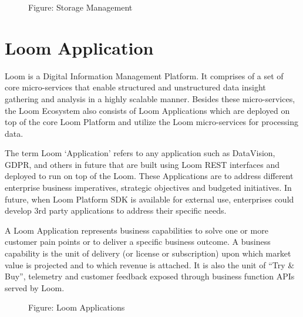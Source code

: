 \documentclass[letterpaper,10pt,english]{sphinxmanual}
\begin{document}
\begin{figure}[htbp]
\centering
\capstart

\noindent{}
\caption{Figure: Storage Management}\label{\detokenize{mcdmp_concepts:id11}}\end{figure}


\section{Loom Application}
\label{\detokenize{mcdmp_concepts:loom-application}}\label{\detokenize{mcdmp_concepts:term-application}}
Loom is a Digital Information Management Platform. It comprises of a set of core micro-services that enable structured and unstructured data insight gathering and analysis in a highly scalable manner. Besides these micro-services, the Loom Ecosystem also consists of Loom Applications which are deployed on top of the core Loom Platform and utilize the Loom micro-services for processing data.

The term Loom ‘Application’ refers to any application such as DataVision, GDPR, and others in future that are built using Loom REST interfaces and deployed to run on top of the Loom. These Applications are to address different enterprise business imperatives, strategic objectives and budgeted initiatives.  In future, when Loom Platform SDK is available for external use, enterprises could develop 3rd party applications to address their specific needs.

A Loom Application represents business capabilities to solve one or more customer pain points or to deliver a specific business outcome.  A business capability is the unit of delivery (or license or subscription) upon which market value is projected and to which revenue is attached. It is also the unit of “Try \& Buy”, telemetry and customer feedback exposed through business function APIs served by Loom.

\begin{figure}[htbp]
\centering
\capstart

\noindent{}
\caption{Figure: Loom Applications}\label{\detokenize{mcdmp_concepts:id12}}\end{figure}
\end{document}
